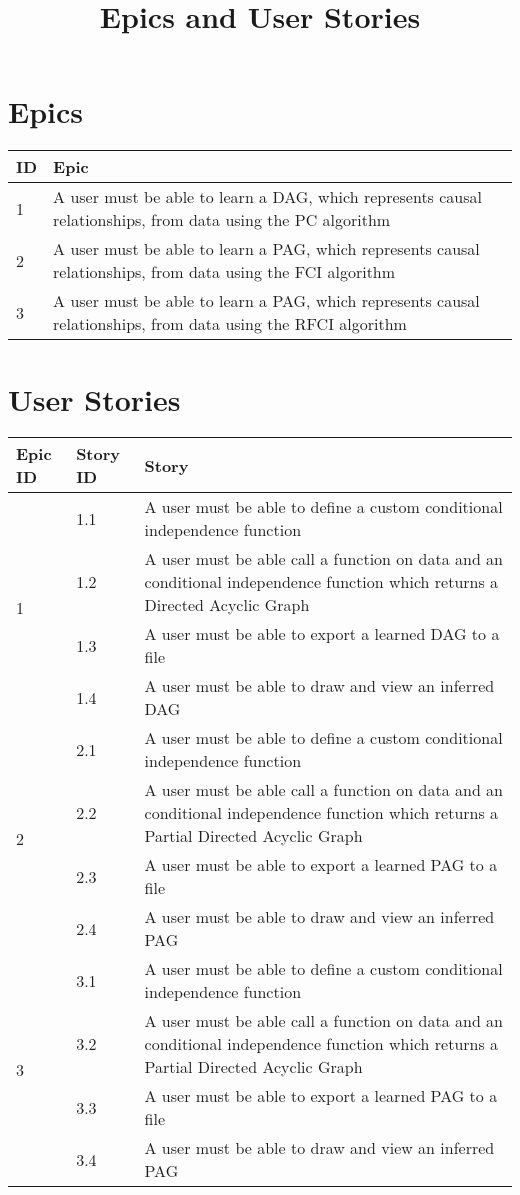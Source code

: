 \documentclass{article}
\begin{document}
\title{Epics and User Stories}
\date{}
\maketitle
\section{Epics}
\begin{tabular}{| l | p{12cm} |}
	\hline	
	ID & Epic \\
	\hline
	1 & A user must be able to learn a DAG, which represents causal relationships, from data using the PC algorithm \\
	\hline
	2 & A user must be able to learn a PAG, which represents causal relationships, from data using the FCI algorithm \\
	\hline
	3 & A user must be able to learn a PAG, which represents causal relationships, from data using the RFCI algorithm \\
	\hline
\end{tabular}

\section{User Stories}

\begin{tabular}{| l | l | p{9.5cm} |}
	\hline
	Epic ID & Story ID & Story \\
	\hline
	\multirow{4}{*}{1} & 1.1 & A user must be able to define a custom conditional independence  function\\
	\cline{2-3}
	& 1.2 & A user  must be able call a function on data and an conditional independence function which returns a Directed Acyclic Graph \\
	\cline{2-3}
	& 1.3 & A user must be able to export a learned DAG to a file \\
	\cline{2-3}
	& 1.4 & A user must be able to draw and view an inferred DAG \\
	\hline
	\multirow{4}{*}{2} & 2.1 & A user must be able to define a custom conditional independence  function\\
	\cline{2-3}
	& 2.2 & A user  must be able call a function on data and an conditional independence function which returns a Partial Directed Acyclic Graph \\
	\cline{2-3}
	& 2.3 & A user must be able to export a learned PAG to a file \\
	\cline{2-3}
	& 2.4 & A user must be able to draw and view an inferred PAG \\
	\hline
	\multirow{4}{*}{3} & 3.1 & A user must be able to define a custom conditional independence  function\\
	\cline{2-3}
	& 3.2 & A user  must be able call a function on data and an conditional independence function which returns a Partial Directed Acyclic Graph \\
	\cline{2-3}
	& 3.3 & A user must be able to export a learned PAG to a file \\
	\cline{2-3}
	& 3.4 & A user must be able to draw and view an inferred PAG \\
	\hline
	 
\end{tabular}
\end{document}
